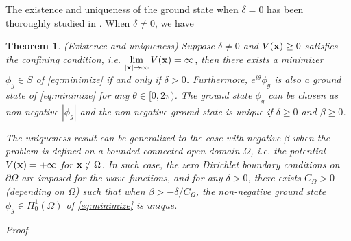 \documentclass{elsarticle}
\newtheorem{theorem}{Theorem}[section]
\newcommand{\bx}{{\bf x} }
\begin{document}
The existence and uniqueness of the ground state when $\delta=0$ has been thoroughly studied in \cite{Bao2013,Lie,Guo,Guo1}.
When $\delta\neq0$, we have
\begin{theorem}\label{thm:mres}(Existence and uniqueness)
Suppose  $\delta\neq0$ and $V(\bx)\ge 0$ satisfies the confining condition, i.e.
$\lim\limits_{|\bx|\to\infty}V(\bx)=\infty$, then  there exists a
minimizer
 $\phi_g\in S$ of
 \eqref{eq:minimize} if and only if $\delta>0$. %
Furthermore, $e^{i\theta}\phi_g$ is also a ground state
of \eqref{eq:minimize} for any $\theta\in\mathbb [0,2\pi)$.
The ground state  $\phi_g$ can be chosen as non-negative $|\phi_g|$ and
the non-negative ground state is unique
if $\delta\ge0$ and $\beta\ge0$.

 The uniqueness result can be generalized to the case with negative $\beta$ when the problem is defined on a bounded connected open domain $\Omega$, i.e. the potential $V(\bx)=+\infty$ for $\bx\notin\Omega$.
In such case, the zero Dirichlet boundary conditions on $\partial\Omega$ are imposed for the wave functions, and
for any $\delta>0$, there exists $C_{\Omega}>0$ (depending on $\Omega$) such that when $\beta> -\delta/C_{\Omega}$, the non-negative ground state $\phi_g\in H_0^1(\Omega)$ of \eqref{eq:minimize}
is unique.
\end{theorem}

{\noindent\it Proof}.
\end{document}
